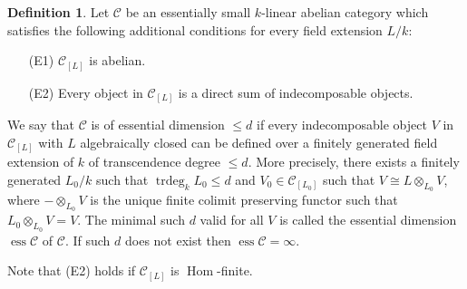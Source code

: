 \documentclass{amsart}
\numberwithin{equation}{section}
\let\cal\mathcal
\theoremstyle{definition}
\newtheorem{definitions}[lemmas]{Definition}
\theoremstyle{remark}
\begin{document}
\begin{definitions} Let ${{\cal C}}$ be an essentially small $k$-linear abelian category
which satisfies the following additional conditions
for every field extension $L/k$:
\begin{enumerate}
\item[(E1)] ${{\cal C}}_{[L]}$ is abelian.
\item[(E2)] Every object in ${{\cal C}}_{[L]}$ is a direct sum of indecomposable objects.
\end{enumerate}
\label{ref-5.2.1-30} 
We say that ${{\cal C}}$ is of essential dimension $\leq d$ if every
indecomposable object $V$ in ${{\cal C}}_{[L]}$ with ${L}$
algebraically closed can be defined over a finitely generated field
extension of $k$ of transcendence degree $\le d$. More precisely, there exists a finitely generated $L_0/k$ such that $\operatorname{trdeg}_k
L_0 \leq d$ and $V_0\in {{\cal C}}_{[L_0]}$ such that $V\cong L\otimes_{L_0}
V$, where $-\otimes_{L_0} V$ is the unique finite colimit preserving functor such that $L_0\otimes_{L_0}V=V$. The minimal such $d$ valid for all $V$ is called the essential
dimension $\operatorname{ess} {{\cal C}}$ of ${{\cal C}}$. If such $d$ does not
exist then $\operatorname{ess}{{\cal C}}=\infty$.
\end{definitions}
Note that (E2) holds if ${{\cal C}}_{[L]}$ is ${\operatorname {Hom}}$-finite.
\end{document}
